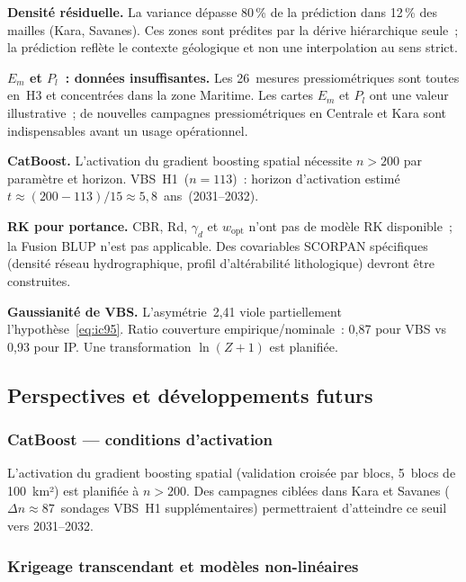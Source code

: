 \documentclass[10pt,a4paper,twocolumn]{article}
\begin{document}
	\textbf{Densité résiduelle.}
	La variance dépasse 80\,\% de la prédiction dans 12\,\% des
	mailles (Kara, Savanes). Ces zones sont prédites par la dérive
	hiérarchique seule~; la prédiction reflète le contexte géologique
	et non une interpolation au sens strict.
	
	\textbf{$E_m$ et $P_l$~: données insuffisantes.}
	Les 26~mesures pressiométriques sont toutes en~H3 et concentrées
	dans la zone Maritime. Les cartes $E_m$ et $P_l$ ont une valeur
	illustrative~; de nouvelles campagnes pressiométriques en Centrale
	et Kara sont indispensables avant un usage opérationnel.
	
	\textbf{CatBoost.}
	L'activation du gradient boosting spatial nécessite
	$n>200$ par paramètre et horizon.
	VBS~H1~($n=113$)~: horizon d'activation estimé
	$t\approx(200-113)/15\approx5{,}8$~ans~(2031--2032).
	
	\textbf{RK pour portance.}
	CBR, Rd, $\gamma_d$ et $w_{\mathrm{opt}}$ n'ont pas de modèle
	RK disponible~; la Fusion BLUP n'est pas applicable.
	Des covariables SCORPAN spécifiques (densité réseau
	hydrographique, profil d'altérabilité lithologique)
	devront être construites.
	
	\textbf{Gaussianité de VBS.}
	L'asymétrie~2{,}41 viole partiellement l'hypothèse~\eqref{eq:ic95}.
	Ratio couverture empirique/nominale~: 0{,}87 pour VBS
	vs 0{,}93 pour IP. Une transformation $\ln(Z+1)$ est planifiée.
	
	\subsection{Perspectives et développements futurs}
	\label{subsec:perspectives}
	
	\subsubsection{CatBoost --- conditions d'activation}
	
	L'activation du gradient boosting spatial (validation croisée
	par blocs, 5~blocs de 100~km²) est planifiée à $n>200$.
	Des campagnes ciblées dans Kara et Savanes
	($\Delta n\approx87$~sondages VBS~H1 supplémentaires)
	permettraient d'atteindre ce seuil vers 2031--2032.
	
	\subsubsection{Krigeage transcendant et modèles non-linéaires}
	
\end{document}
